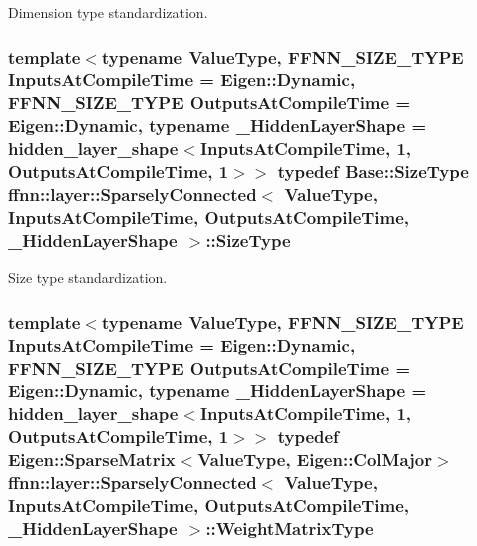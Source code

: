 Dimension type standardization. 

\hypertarget{classffnn_1_1layer_1_1_sparsely_connected_a8c23b3731363a9c52f0fc2ad9f1a8f2a}{
\subsubsection[{Size\-Type}]{\setlength{\rightskip}{0pt plus 5cm}template$<$typename Value\-Type, F\-F\-N\-N\-\_\-\-S\-I\-Z\-E\-\_\-\-T\-Y\-P\-E Inputs\-At\-Compile\-Time = Eigen\-::\-Dynamic, F\-F\-N\-N\-\_\-\-S\-I\-Z\-E\-\_\-\-T\-Y\-P\-E Outputs\-At\-Compile\-Time = Eigen\-::\-Dynamic, typename \-\_\-\-Hidden\-Layer\-Shape = hidden\-\_\-layer\-\_\-shape$<$\-Inputs\-At\-Compile\-Time, 1, Outputs\-At\-Compile\-Time, 1$>$$>$ typedef {\bf Base\-::\-Size\-Type} {\bf ffnn\-::layer\-::\-Sparsely\-Connected}$<$ Value\-Type, Inputs\-At\-Compile\-Time, Outputs\-At\-Compile\-Time, \-\_\-\-Hidden\-Layer\-Shape $>$\-::{\bf Size\-Type}}}\label{classffnn_1_1layer_1_1_sparsely_connected_a8c23b3731363a9c52f0fc2ad9f1a8f2a}


Size type standardization. 

\hypertarget{classffnn_1_1layer_1_1_sparsely_connected_ade8f7fd54c27df9f18e214c4b7ce1e79}{
\subsubsection[{Weight\-Matrix\-Type}]{\setlength{\rightskip}{0pt plus 5cm}template$<$typename Value\-Type, F\-F\-N\-N\-\_\-\-S\-I\-Z\-E\-\_\-\-T\-Y\-P\-E Inputs\-At\-Compile\-Time = Eigen\-::\-Dynamic, F\-F\-N\-N\-\_\-\-S\-I\-Z\-E\-\_\-\-T\-Y\-P\-E Outputs\-At\-Compile\-Time = Eigen\-::\-Dynamic, typename \-\_\-\-Hidden\-Layer\-Shape = hidden\-\_\-layer\-\_\-shape$<$\-Inputs\-At\-Compile\-Time, 1, Outputs\-At\-Compile\-Time, 1$>$$>$ typedef Eigen\-::\-Sparse\-Matrix$<$Value\-Type, Eigen\-::\-Col\-Major$>$ {\bf ffnn\-::layer\-::\-Sparsely\-Connected}$<$ Value\-Type, Inputs\-At\-Compile\-Time, Outputs\-At\-Compile\-Time, \-\_\-\-Hidden\-Layer\-Shape $>$\-::{\bf Weight\-Matrix\-Type}}}\label{classffnn_1_1layer_1_1_sparsely_connected_ade8f7fd54c27df9f18e214c4b7ce1e79}


